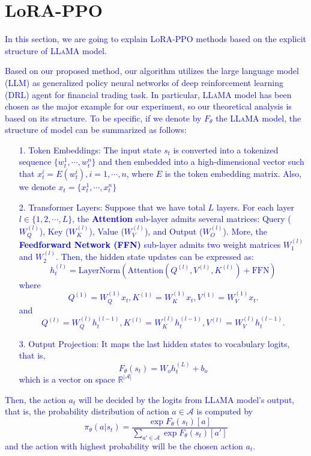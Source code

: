 \section{LoRA-PPO}
\textcolor{blue}{
In this section, we are going to explain LoRA-PPO methods based on the explicit structure of \textsc{LLaMA} model.}

\textcolor{blue}{
Based on our proposed method, our algorithm utilizes the large language model (LLM) as generalized policy neural networks of deep reinforcement learning (DRL) agent for financial trading task. In particular, \textsc{LLaMA} model has been chosen as the major example for our experiment, so our theoretical analysis is based on its structure. To be specific, if we denote by $F_\theta$ the \textsc{LLaMA} model, the structure of model can be summarized as follows:
\begin{itemize}
    \item[1.] Token Embeddings: The input state $s_t$ is converted into a tokenized sequence $\{w_t^{1},\cdots,w_t^{n}\}$ and then embedded into a high-dimensional vector such that $x_t^{i}=E(w_t^{i}),i=1,\cdots,n$, where $E$ is the token embedding matrix. Also, we denote $x_t=\{x_t^{1},\cdots,x_t^{n}\}$
    \item[2.] Transformer Layers: Suppose that we have total $L$ layers. For each layer $l\in\{1,2,\cdots,L\}$, the \textbf{Attention} sub-layer admits several matrices: Query ($W_Q^{(l)}$), Key ($W_K^{(l)}$), Value ($W_V^{(l)}$), and Output ($W_O^{(l)}$). More, the \textbf{Feedforward Network (FFN)} sub-layer admits two weight matrices $W_1^{(l)}$ and $W_2^{(l)}$. Then, the hidden state updates can be expressed as:
    \begin{equation*}
        h_t^{(l)}=\text{LayerNorm}(\text{Attention}(Q^{(l)},V^{(l)},K^{(l)})+\text{FFN})
    \end{equation*}
    where\begin{equation*}
        Q^{(1)}=W_Q^{(1)}x_t, K^{(1)}=W_K^{(1)}x_t,
        V^{(1)}=W_V^{(1)}x_t.
    \end{equation*}
    and\begin{equation*}
        Q^{(l)}=W_Q^{(l)}h_t^{(l-1)}, K^{(l)}=W_K^{(l)}h_t^{(l-1)},
        V^{(l)}=W_V^{(l)}h_t^{(l-1)}.
    \end{equation*} 
    \item[3.] Output Projection: It maps the last hidden states to vocabulary logits, that is,
    \begin{equation*}
        F_\theta(s_t)=W_o h_t^{(L)} + b_o
    \end{equation*}
    which is a vector on space $\mathbb{R}^{|\mathcal{A}|}$
\end{itemize}
Then, the action $a_t$ will be decided by the logits from \textsc{LLaMA} model's output, that is, the probability distribution of action $a\in\mathcal{A}$ is computed by
\begin{equation*}
    \pi_\theta(a|s_t) = \frac{\exp{F_\theta(s_t)[a]}}{\sum_{a'\in\mathcal{A}}\exp{F_\theta(s_t)[a']}}
\end{equation*}
and the action with highest probability will be the chosen action $a_t$.
}

